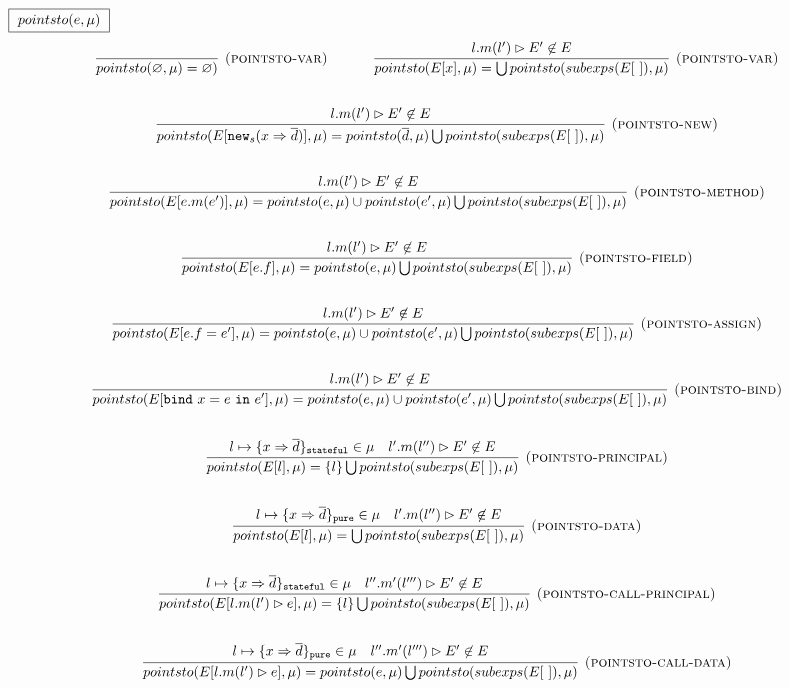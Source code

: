 \documentclass{llncs}
\newcommand{\keywadj}[1]{\mathtt{#1}}
\newcommand{\keyw}[1]{\keywadj{#1}~}
\begin{document}
$\fbox{$~pointsto(e, \mu)~$}$
\[
\begin{array}{c}
\infer[\textsc{(pointsto-var)}]
  {pointsto(\varnothing, \mu) = \varnothing)}
  {}%
~~~~~~~~~~
\infer[\textsc{(pointsto-var)}]
  {pointsto(E[x],\mu) = \bigcup pointsto(subexps(E[~]), \mu)}
  {l.m(l') \rhd E' \not\in E}\\[5ex]
\infer[\textsc{(pointsto-new)}]
  {pointsto(E[\keywadj{new}_{s}(x \Rightarrow \overline{d})],\mu) = pointsto(\overline{d},\mu) \bigcup pointsto(subexps(E[~]), \mu)}
  {l.m(l') \rhd E' \not\in E}\\[5ex]

\infer[\textsc{(pointsto-method)}]
  {pointsto(E[e.m(e')],\mu) = pointsto(e,\mu) \cup pointsto(e',\mu) \bigcup pointsto(subexps(E[~]), \mu)}
  {l.m(l') \rhd E' \not\in E}\\[5ex]

\infer[\textsc{(pointsto-field)}]
  {pointsto(E[e.f],\mu) = pointsto(e,\mu) \bigcup pointsto(subexps(E[~]), \mu)}
  {l.m(l') \rhd E' \not\in E}\\[5ex]

\infer[\textsc{(pointsto-assign)}]
  {pointsto(E[e.f = e'],\mu) = pointsto(e,\mu) \cup pointsto(e',\mu) \bigcup pointsto(subexps(E[~]), \mu)}
  {l.m(l') \rhd E' \not\in E}\\[5ex]

\infer[\textsc{(pointsto-bind)}]
  {pointsto(E[\keyw{bind} x = e~\keyw{in} e'],\mu) = pointsto(e,\mu) \cup pointsto(e',\mu) \bigcup pointsto(subexps(E[~]), \mu)}
  {l.m(l') \rhd E' \not\in E}\\[5ex]

\infer[\textsc{(pointsto-principal)}]
  {pointsto(E[l],\mu) = \{ l \} \bigcup pointsto(subexps(E[~]), \mu)}
  {l \mapsto \{ x \Rightarrow \overline{d} \}_\keywadj{stateful} \in \mu & l'.m(l'') \rhd E' \not\in E}\\[5ex]
\infer[\textsc{(pointsto-data)}]
  {pointsto(E[l],\mu) = \bigcup pointsto(subexps(E[~]), \mu)}
  {l \mapsto \{ x \Rightarrow \overline{d} \}_\keywadj{pure} \in \mu & l'.m(l'') \rhd E' \not\in E}\\[5ex]

\infer[\textsc{(pointsto-call-principal)}]
  {pointsto(E[l.m(l') \rhd e],\mu) = \{ l \} \bigcup pointsto(subexps(E[~]), \mu)}
  {l \mapsto \{ x \Rightarrow \overline{d} \}_\keywadj{stateful} \in \mu & l''.m'(l''') \rhd E' \not\in E}\\[5ex]

\infer[\textsc{(pointsto-call-data)}]
  {pointsto(E[l.m(l') \rhd e],\mu) = pointsto(e,\mu) \bigcup pointsto(subexps(E[~]), \mu)}
  {l \mapsto \{ x \Rightarrow \overline{d} \}_\keywadj{pure} \in \mu & l''.m'(l''') \rhd E' \not\in E}\\[5ex]


\end{array}
\]
\end{document}
